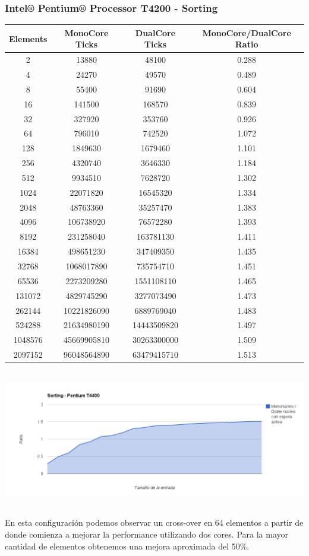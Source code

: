 \subsubsection{Intel® Pentium® Processor T4200 - Sorting}
\begin{center}
\begin{tabular}{|c|c|c|c|}
	\hline
		Elements & MonoCore Ticks & DualCore Ticks & MonoCore/DualCore Ratio\\
	\hline
		2 & 13880 & 48100 & 0.288\\
	\hline
		4 & 24270 & 49570 & 0.489\\
	\hline
		8 & 55400 & 91690 & 0.604\\
	\hline
		16 & 141500 & 168570 & 0.839\\
	\hline
		32 & 327920 & 353760 & 0.926\\
	\hline
		64 & 796010 & 742520 & 1.072\\
	\hline
		128 & 1849630 & 1679460 & 1.101\\
	\hline
		256 & 4320740 & 3646330 & 1.184\\
	\hline
		512 & 9934510 & 7628720 & 1.302\\
	\hline
		1024 & 22071820 & 16545320 & 1.334\\
	\hline
		2048 & 48763360 & 35257470 & 1.383\\
	\hline
		4096 & 106738920 & 76572280 & 1.393\\
	\hline
		8192 & 231258040 & 163781130 & 1.411\\
	\hline
		16384 & 498651230 & 347409350 & 1.435\\
	\hline
		32768 & 1068017890 & 735754710 & 1.451\\
	\hline
		65536 & 2273209280 & 1551108110 & 1.465\\
	\hline
		131072 & 4829745290 & 3277073490 & 1.473\\
	\hline
		262144 & 10221826090 & 6889769040 & 1.483\\
	\hline
		524288 & 21634980190 & 14443509820 & 1.497\\
	\hline
		1048576 & 45669905810 & 30263300000 & 1.509\\
	\hline
		2097152 & 96048564890 & 63479415710 & 1.513\\
	\hline
\end{tabular}
\end{center}
\begin{center}
    \includegraphics[height=6cm]{images/pentium_d_sorting.png}
\end{center}
En esta configuración podemos observar un cross-over en 64 elementos a partir de donde comienza a mejorar la performance utilizando dos cores. Para la mayor cantidad de elementos obtenemos una mejora aproximada del 50\%.
